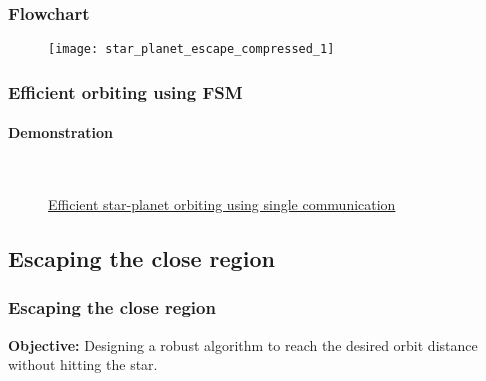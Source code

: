 \begin{frame}
\frametitle{Flowchart}
\begin{figure}[H]
	\centering
	\texttt{[image: star\_planet\_escape\_compressed\_1]}
\end{figure}
\end{frame}

\begin{frame}
\frametitle{Efficient orbiting using FSM}
\framesubtitle{Demonstration}
	\begin{figure}[H]
		\begin{center}
		\\
		\vspace{0.2cm}
		\caption{\href{https://youtu.be/LRgOzhAJI1k}{Efficient star-planet orbiting using single communication}}
		\label{fig:shape_formation_demo}
	\end{center}
	\end{figure}
\end{frame}

\subsection{Escaping the close region}
\begin{frame}
\frametitle{Escaping the close region}
\textbf{Objective:} Designing a robust algorithm to reach the desired orbit distance without hitting the star.
\end{frame}

